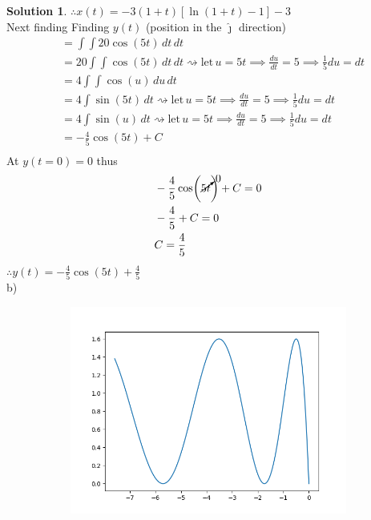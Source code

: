 \documentclass[10pt]{article}
\theoremstyle{definition}
\newtheorem{soln}{Solution}
\newcommand{\jhat}{\boldsymbol{\hat{\jmath}}}
\begin{document}
\begin{soln}
     $\therefore x(t)= -3(1+t)\left[\ln(1+t)-1\right] - 3$ \\
     Next finding Finding $y(t)$ (position in the $\jhat$ direction)
     \begin{align*}
           & = \int \int 20\cos(5t) \,dt\,dt                                                                                         \\
           & = 20\int \int \cos(5t) \,dt\,dt \rightsquigarrow \mathrm{ let} \, u=5t \implies\frac{du}{dt}=5\implies \frac{1}{5}du=dt \\
           & = 4\int \int \cos(u) \,du\,dt                                                                                           \\
           & = 4\int \sin(5t)\,dt \rightsquigarrow \mathrm{ let} \, u=5t \implies\frac{du}{dt}=5\implies \frac{1}{5}du=dt            \\
           & = 4\int \sin(u)\,dt \rightsquigarrow \mathrm{ let} \, u=5t \implies\frac{du}{dt}=5\implies \frac{1}{5}du=dt             \\
           & = -\frac{4}{5}\cos(5t) + C                                                                                              \\
     \end{align*}
     At $y(t=0)=0$ thus
     \begin{align*}
           & -\frac{4}{5}\cos(\cancelto{0}{5t}) + C = 0 \\
           & -\frac{4}{5} + C = 0                       \\
           & C=\frac{4}{5}
     \end{align*}
     $\therefore y(t) = -\frac{4}{5}\cos(5t) + \frac{4}{5}$ \\
     b) \\
     \begin{figure}[h]
          \begin{subfigure}[t]{0.49\textwidth}
               \vspace{-27pt}
               \includegraphics[width=\textwidth]{Figure_1.png}

\end{subfigure}
\end{figure}
\end{soln}
\end{document}
